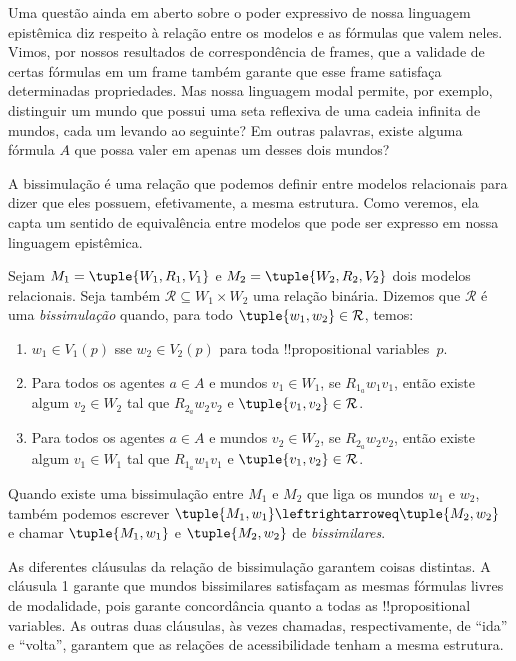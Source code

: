 \documentclass[../../../include/open-logic-section]{subfiles}
\begin{document}


Uma questão ainda em aberto sobre o poder expressivo de nossa linguagem
epistêmica diz respeito à relação entre os modelos e as fórmulas que
valem neles. Vimos, por nossos resultados de correspondência de frames,
que a validade de certas fórmulas em um frame também garante que esse
frame satisfaça determinadas propriedades. Mas nossa linguagem modal
permite, por exemplo, distinguir um mundo que possui uma seta reflexiva
de uma cadeia infinita de mundos, cada um levando ao seguinte? Em outras
palavras, existe alguma fórmula $A$ que possa valer em apenas um desses
dois mundos?

A bissimulação é uma relação que podemos definir entre modelos
relacionais para dizer que eles possuem, efetivamente, a mesma
estrutura. Como veremos, ela capta um sentido de equivalência entre
modelos que pode ser expresso em nossa linguagem epistêmica.

\begin{defn}[Bissimulação]
Sejam $M_1 = \tuple{W_1, R_1, V_1}$ e $M_2 = \tuple{W_2, R_2, V_2}$
dois modelos relacionais. Seja também
$\mathcal{R} \subseteq W_1 \times W_2$ uma relação binária. Dizemos que
$\mathcal{R}$ é uma \emph{bissimulação} quando, para todo
$\tuple{w_1, w_2} \in \mathcal{R}$, temos:

\begin{enumerate}
  \item $w_1 \in V_1(p)$ sse $w_2 \in V_2(p)$ para toda
  !!{propositional variable}s~$p$.
  \item Para todos os agentes $a \in A$ e mundos $v_1 \in W_1$, se
  $R_{1_a} w_1 v_1$, então existe algum $v_2 \in W_2$ tal que
  $R_{2_a} w_2 v_2$ e $\tuple{v_1, v_2} \in
  \mathcal{R}$.
  \item Para todos os agentes $a \in A$ e mundos $v_2 \in W_2$, se
   $R_{2_a} w_2 v_2$, então existe algum $v_1 \in W_1$ tal que
   $R_{1_a} w_1 v_1$ e $\tuple{v_1, v_2} \in
   \mathcal{R}$.
\end{enumerate}

Quando existe uma bissimulação entre $M_1$ e $M_2$ que liga os mundos
$w_1$ e $w_2$, também podemos escrever $\tuple{M_1, w_1} \leftrightarroweq
\tuple{M_2, w_2}$ e chamar $\tuple{M_1, w_1}$ e $\tuple{M_2, w_2}$ de
\emph{bissimilares}.
\end{defn}

As diferentes cláusulas da relação de bissimulação garantem coisas
distintas. A cláusula 1 garante que mundos bissimilares satisfaçam as
mesmas fórmulas livres de modalidade, pois garante concordância quanto
a todas as !!{propositional variable}s. As outras duas cláusulas,
às vezes chamadas, respectivamente, de ``ida'' e ``volta'', garantem
que as relações de acessibilidade tenham a mesma estrutura.
\end{document}
